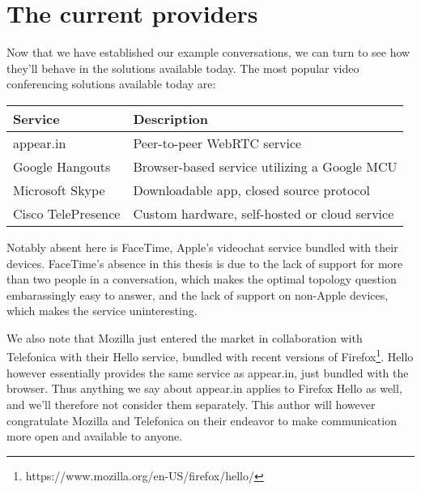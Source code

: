 

\section{The current providers}

Now that we have established our example conversations, we can turn to see how they'll behave in the solutions available today. The most popular video conferencing solutions available today are:

\begin{center}
	\label{tab:existing-solutions}
	\begin{tabular}{| l | l |}
		\hline
		\textbf{Service} & \textbf{Description} \\ \hline
		appear.in & Peer-to-peer WebRTC service \\ \hline
		Google Hangouts & Browser-based service utilizing a Google MCU \\ \hline
		Microsoft Skype & Downloadable app, closed source protocol \\ \hline
		Cisco TelePresence & Custom hardware, self-hosted or cloud service \\ \hline
	\end{tabular}
\end{center}

Notably absent here is FaceTime, Apple's videochat service bundled with their devices. FaceTime's absence in this thesis is due to the lack of support for more than two people in a conversation, which makes the optimal topology question embarassingly easy to answer, and the lack of support on non-Apple devices, which makes the service uninteresting.

We also note that Mozilla just entered the market in collaboration with Telefonica with their Hello service, bundled with recent versions of Firefox\footnote{https://www.mozilla.org/en-US/firefox/hello/}. Hello however essentially provides the same service as appear.in, just bundled with the browser. Thus anything we say about appear.in applies to Firefox Hello as well, and we'll therefore not consider them separately. This author will however congratulate Mozilla and Telefonica on their endeavor to make communication more open and available to anyone.

